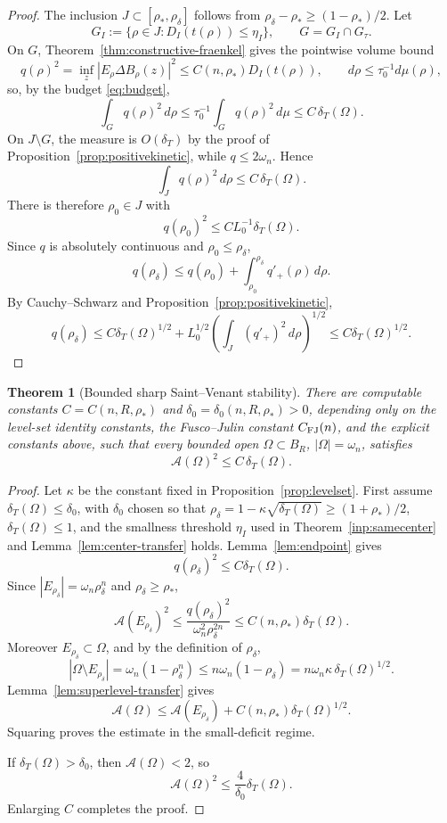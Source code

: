 \documentclass[11pt]{amsart}
\newtheorem{theorem}{Theorem}[section]
\theoremstyle{definition}
\newcommand{\Om}{\Omega}
\newcommand{\Fr}{\mathcal A}
\newcommand{\dT}{\delta_T}
\newcommand{\rstar}{\rho_*}
\newcommand{\rdel}{\rho_\delta}
\begin{document}
\begin{proof}
The inclusion \(J\subset[\rstar,\rdel]\) follows from
\(\rdel-\rstar\ge(1-\rstar)/2\).  Let
\[
   G_I:=\{\rho\in J:D_I(t(\rho))\le\eta_I\},
   \qquad G=G_I\cap G_\tau .
\]
On \(G\), Theorem~\ref{thm:constructive-fraenkel} gives the pointwise volume
bound
\[
   q(\rho)^2=\inf_z|E_\rho\Delta B_\rho(z)|^2\le C(n,\rstar)D_I(t(\rho)),
   \qquad d\rho\le\tau_0^{-1}d\mu(\rho),
\]
so, by the budget \eqref{eq:budget},
\[
   \int_G q(\rho)^2\,d\rho\le\tau_0^{-1}\!\int_G q(\rho)^2\,d\mu\le C\,\dT(\Om).
\]
On \(J\setminus G\), the measure is \(O(\dT)\) by the proof of
Proposition~\ref{prop:positivekinetic}, while \(q\le2\omega_n\).  Hence
\[
   \int_J q(\rho)^2\,d\rho\le C\,\dT(\Om).
\]
There is therefore \(\rho_0\in J\) with
\[
   q(\rho_0)^2\le C L_0^{-1}\dT(\Om).
\]
Since \(q\) is absolutely continuous and \(\rho_0\le\rdel\),
\[
   q(\rdel)
   \le q(\rho_0)+\int_{\rho_0}^{\rdel}q'_+(\rho)\,d\rho.
\]
By Cauchy--Schwarz and Proposition~\ref{prop:positivekinetic},
\[
   q(\rdel)
   \le C\dT(\Om)^{1/2}
      +L_0^{1/2}\left(\int_J(q'_+)^2\,d\rho\right)^{1/2}
   \le C\dT(\Om)^{1/2}.
\]
\end{proof}

\begin{theorem}[Bounded sharp Saint--Venant stability]
\label{thm:boundedSV}
There are computable constants \(C=C(n,R,\rstar)\) and
\(\delta_0=\delta_0(n,R,\rstar)>0\), depending only on the level-set
identity constants, the Fusco--Julin constant \(C_{\rm FJ}(n)\),
and the explicit constants above, such that every bounded open \(\Om\subset B_R\),
\(|\Om|=\omega_n\), satisfies
\[
   \Fr(\Om)^2\le C\,\dT(\Om).
\]
\end{theorem}

\begin{proof}
Let \(\kappa\) be the constant fixed in Proposition~\ref{prop:levelset}.
First assume \(\dT(\Om)\le\delta_0\), with \(\delta_0\) chosen so that
\(\rdel=1-\kappa\sqrt{\dT(\Om)}\ge(1+\rstar)/2\), \(\dT(\Om)\le1\), and
the smallness threshold \(\eta_I\) used in
Theorem~\ref{inp:samecenter} and Lemma~\ref{lem:center-transfer} holds.
Lemma~\ref{lem:endpoint} gives
\[
   q(\rdel)^2\le C\dT(\Om).
\]
Since \(|E_{\rdel}|=\omega_n\rdel^n\) and \(\rdel\ge\rstar\),
\[
   \Fr(E_{\rdel})^2
   \le \frac{q(\rdel)^2}{\omega_n^2\rdel^{2n}}
   \le C(n,\rstar)\dT(\Om).
\]
Moreover \(E_{\rdel}\subset\Om\), and by the definition of \(\rdel\),
\[
   |\Om\setminus E_{\rdel}|
   =\omega_n(1-\rdel^n)
   \le n\omega_n(1-\rdel)
   =n\omega_n\kappa\,\dT(\Om)^{1/2}.
\]
Lemma~\ref{lem:superlevel-transfer} gives
\[
   \Fr(\Om)
   \le \Fr(E_{\rdel})+C(n,\rstar)\dT(\Om)^{1/2}.
\]
Squaring proves the estimate in the small-deficit regime.

If \(\dT(\Om)>\delta_0\), then \(\Fr(\Om)<2\), so
\[
   \Fr(\Om)^2\le \frac{4}{\delta_0}\dT(\Om).
\]
Enlarging \(C\) completes the proof.
\end{proof}
\end{document}
